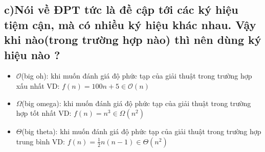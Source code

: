 \documentclass[10pt,a4paper]{article}
\begin{document}
\subsection*{c)Nói về ĐPT tức là đề cập tới các ký hiệu tiệm cận, mà có nhiều ký hiệu khác nhau. Vậy khi nào(trong trường hợp nào) thì nên dùng ký hiệu nào ?}
\begin{itemize}
    \item $\mathcal{O}$(big oh): khi muốn đánh giá độ phức tạp của giải thuật trong trường hợp xấu nhất
    \subitem VD: $f(n) = 100n+5 \in \mathcal{O}(n)$
    \item $\Omega$(big omega): khi muốn đánh giá độ phức tạp của giải thuật trong trường hợp tốt nhất
    \subitem VD: $f(n) = n^3 \in \Omega(n^2)$
    \item $\Theta$(big theta): khi muốn đánh giá độ phức tạp của giải thuật trong trường hợp trung bình
    \subitem VD: $f(n) = \frac{1}{2}n(n-1) \in \Theta(n^2)$
\end{itemize}
\end{document}
